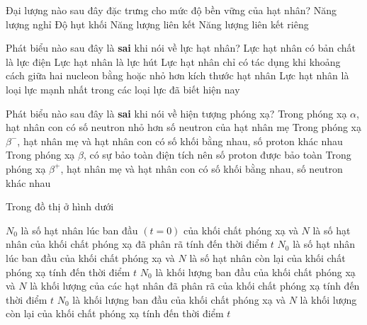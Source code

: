 \begin{ex}
	Đại lượng nào sau đây đặc trưng cho mức độ bền vững của hạt nhân?
	\choice
	{Năng lượng nghỉ}
	{Độ hụt khối}
	{Năng lượng liên kết}
	{\True Năng lượng liên kết riêng}
	\loigiai{}
\end{ex}
\begin{ex}
	Phát biểu nào sau đây là \textbf{sai} khi nói về lực hạt nhân?	
	\choice
	{\True Lực hạt nhân có bản chất là lực điện}
	{Lực hạt nhân là lực hút}
	{Lực hạt nhân chỉ có tác dụng khi khoảng cách giữa hai nucleon bằng hoặc nhỏ hơn kích thước hạt nhân}
	{Lực hạt nhân là loại lực mạnh nhất trong các loại lực đã biết hiện nay}
	\loigiai{}
\end{ex}
\begin{ex}
	Phát biểu nào sau đây là \textbf{sai} khi nói về hiện tượng phóng xạ?
	\choice
	{Trong phóng xạ $\alpha$, hạt nhân con có số neutron nhỏ hơn số neutron của hạt nhân mẹ}
	{Trong phóng xạ $\beta^{-}$, hạt nhân mẹ và hạt nhân con có số khối bằng nhau, số proton khác nhau}
	{\True Trong phóng xạ $\beta$, có sự bảo toàn điện tích nên số proton được bảo toàn}
	{Trong phóng xạ $\beta^+$, hạt nhân mẹ và hạt nhân con có số khối bằng nhau, số neutron khác nhau}
	\loigiai{}
\end{ex}
\begin{ex}
	Trong đồ thị ở hình dưới
	\begin{center}
	\end{center}
	\choice
	{$N_0$ là số hạt nhân lúc ban đầu $\left(t=0\right)$ của khối chất phóng xạ và $N$ là số hạt nhân của khối chất phóng xạ đã phân rã tính đến thời điểm $t$}
	{\True $N_0$ là số hạt nhân lúc ban đầu của khối chất phóng xạ và $N$ là số hạt nhân còn lại của khối chất phóng xạ tính đến thời điểm $t$}
	{$N_0$ là khối lượng ban đầu của khối chất phóng xạ và $N$ là khối lượng của các hạt nhân đã phân rã của khối chất phóng xạ tính đến thời điểm $t$}
	{$N_0$ là khối lượng ban đầu của khối chất phóng xạ và $N$ là khối lượng còn lại của khối chất phóng xạ tính đến thời điểm $t$}
	\loigiai{}
\end{ex}
